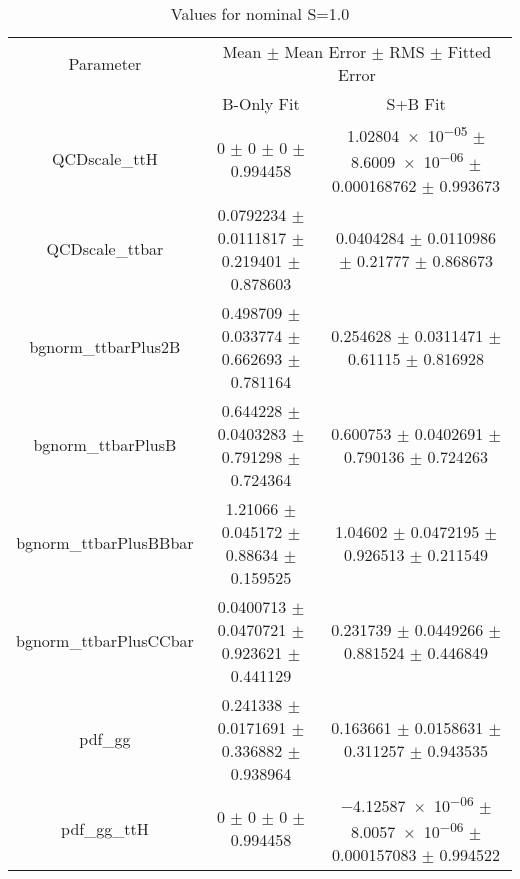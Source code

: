 \begin{table}
\centering
\caption{Values for nominal S=1.0}
\begin{tabular}{ccc}
\toprule
Parameter & \multicolumn{2}{c}{Mean $\pm$ Mean Error $\pm$ RMS $\pm$ Fitted Error}\\
 & B-Only Fit & S+B Fit\\
\midrule
QCDscale\_ttH & \num{0} $\pm$ \num{0} $\pm$ \num{0} $\pm$ \num{0.994458} & \num{1.02804e-05} $\pm$ \num{8.6009e-06} $\pm$ \num{0.000168762} $\pm$ \num{0.993673}\\
QCDscale\_ttbar & \num{0.0792234} $\pm$ \num{0.0111817} $\pm$ \num{0.219401} $\pm$ \num{0.878603} & \num{0.0404284} $\pm$ \num{0.0110986} $\pm$ \num{0.21777} $\pm$ \num{0.868673}\\
bgnorm\_ttbarPlus2B & \num{0.498709} $\pm$ \num{0.033774} $\pm$ \num{0.662693} $\pm$ \num{0.781164} & \num{0.254628} $\pm$ \num{0.0311471} $\pm$ \num{0.61115} $\pm$ \num{0.816928}\\
bgnorm\_ttbarPlusB & \num{0.644228} $\pm$ \num{0.0403283} $\pm$ \num{0.791298} $\pm$ \num{0.724364} & \num{0.600753} $\pm$ \num{0.0402691} $\pm$ \num{0.790136} $\pm$ \num{0.724263}\\
bgnorm\_ttbarPlusBBbar & \num{1.21066} $\pm$ \num{0.045172} $\pm$ \num{0.88634} $\pm$ \num{0.159525} & \num{1.04602} $\pm$ \num{0.0472195} $\pm$ \num{0.926513} $\pm$ \num{0.211549}\\
bgnorm\_ttbarPlusCCbar & \num{0.0400713} $\pm$ \num{0.0470721} $\pm$ \num{0.923621} $\pm$ \num{0.441129} & \num{0.231739} $\pm$ \num{0.0449266} $\pm$ \num{0.881524} $\pm$ \num{0.446849}\\
pdf\_gg & \num{0.241338} $\pm$ \num{0.0171691} $\pm$ \num{0.336882} $\pm$ \num{0.938964} & \num{0.163661} $\pm$ \num{0.0158631} $\pm$ \num{0.311257} $\pm$ \num{0.943535}\\
pdf\_gg\_ttH & \num{0} $\pm$ \num{0} $\pm$ \num{0} $\pm$ \num{0.994458} & \num{-4.12587e-06} $\pm$ \num{8.0057e-06} $\pm$ \num{0.000157083} $\pm$ \num{0.994522}\\
\bottomrule
\end{tabular}
\end{table}